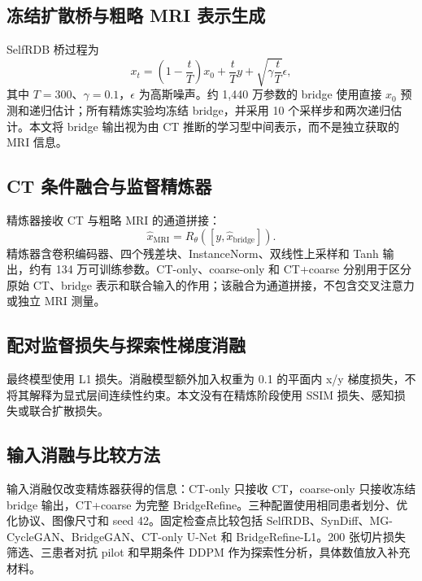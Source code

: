 \documentclass[UTF8,11pt,a4paper]{ctexart}
\begin{document}
\subsection{冻结扩散桥与粗略 MRI 表示生成}
SelfRDB 桥过程为
\begin{equation}
x_t=\left(1-\frac{t}{T}\right)x_0+\frac{t}{T}y+\sqrt{\gamma\frac{t}{T}}\epsilon,
\end{equation}
其中 $T=300$、$\gamma=0.1$，$\epsilon$ 为高斯噪声。约 1,440 万参数的 bridge 使用直接 $x_0$ 预测和递归估计；所有精炼实验均冻结 bridge，并采用 10 个采样步和两次递归估计。本文将 bridge 输出视为由 CT 推断的学习型中间表示，而不是独立获取的 MRI 信息。

\subsection{CT 条件融合与监督精炼器}
精炼器接收 CT 与粗略 MRI 的通道拼接：
\begin{equation}
\hat{x}_{\mathrm{MRI}}=R_\theta([y,\hat{x}_{\mathrm{bridge}}]).
\end{equation}
精炼器含卷积编码器、四个残差块、InstanceNorm、双线性上采样和 Tanh 输出，约有 134 万可训练参数。CT-only、coarse-only 和 CT+coarse 分别用于区分原始 CT、bridge 表示和联合输入的作用；该融合为通道拼接，不包含交叉注意力或独立 MRI 测量。

\subsection{配对监督损失与探索性梯度消融}
最终模型使用 L1 损失。消融模型额外加入权重为 0.1 的平面内 x/y 梯度损失，不将其解释为显式层间连续性约束。本文没有在精炼阶段使用 SSIM 损失、感知损失或联合扩散损失。

\subsection{输入消融与比较方法}
输入消融仅改变精炼器获得的信息：CT-only 只接收 CT，coarse-only 只接收冻结 bridge 输出，CT+coarse 为完整 BridgeRefine。三种配置使用相同患者划分、优化协议、图像尺寸和 seed 42。固定检查点比较包括 SelfRDB、SynDiff、MG-CycleGAN、BridgeGAN、CT-only U-Net 和 BridgeRefine-L1。200 张切片损失筛选、三患者对抗 pilot 和早期条件 DDPM 作为探索性分析，具体数值放入补充材料。
\end{document}
